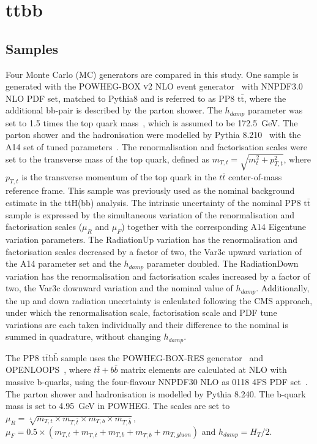 \section{ttbb}
\label{sec:ttbb}

\subsection{Samples}
Four Monte Carlo (MC) generators are compared in this study. %
One sample is generated with the \textsc{POWHEG-BOX v2} NLO event generator~\cite{Nason:2004rx,Frixione:2007vw,Alioli:2010xd,Campbell:2014kua} with NNPDF3.0 NLO PDF set, matched to Pythia8 and is referred to as PP8 $\mathrm{t\bar{t}}$, where the additional bb-pair is described by the parton shower. The $h_{damp}$ parameter was set to 1.5 times the top quark mass~\cite{ATL-PHYS-PUB-2016-020}, which is assumed to be 172.5~GeV. The parton shower and the hadronisation were modelled by Pythia 8.210~\cite{PhysRevD.78.014026} with the A14 set of tuned parameters~\cite{ATL-PHYS-PUB-2014-021}. The renormalisation and factorisation scales were set to the transverse mass of the top quark, defined as $m_{T,t} = \sqrt{m^2_t + p^2_{T,t}}$, where $p_{T,t}$ is the transverse momentum of the top quark in the $t\overline{t}$ center-of-mass reference frame. This sample was previously used as the nominal background estimate in the ttH(bb) analysis.
The intrinsic uncertainty of the nominal PP8 $\mathrm{t\bar{t}}$ sample is expressed by the simultaneous variation of the renormalisation and factorisation scales ($\mu_R$ and $\mu_F$) together with the corresponding A14 Eigentune variation parameters. The RadiationUp variation has the renormalisation and factorisation scales decreased by a factor of two, the Var3c upward variation of the A14 parameter set and the $h_{damp}$ parameter doubled. The RadiationDown variation has the renormalisation and factorisation scales increased by a factor of two, the Var3c downward variation and the nominal value of $h_{damp}$.
Additionally, the up and down radiation uncertainty is calculated following the CMS approach, under which the renormalisation scale, factorisation scale and PDF tune variations are each taken individually and their difference to the nominal is summed in quadrature, without changing $h_{damp}$.

The PP8 $\mathrm{t\bar{t}b\bar{b}}$ sample uses the \textsc{POWHEG-BOX-RES} generator~\cite{jeo2015treatment} and \textsc{OPENLOOPS}~\cite{Cascioli:2011va}, where $t\bar{t}+b\bar{b}$ matrix elements are calculated at NLO with massive b-quarks, using the four-flavour NNPDF30 NLO as 0118 4FS PDF set~\cite{Jezo:2018yaf}. The parton shower and hadronisation is modelled by Pythia 8.240. The b-quark mass is set to 4.95~GeV in \textsc{POWHEG}. The scales are set to $\mu_R=\sqrt[4]{m_{T,t}\times m_{T,\bar{t}}\times m_{T,b}\times m_{T,\bar{b}} }$, $\mu_F=0.5\times(m_{T,t}+m_{T,\bar{t}}+m_{T,b}+ m_{T,\bar{b}}+m_{T,gluon})$ and $h_{damp}=H_T/2$.

